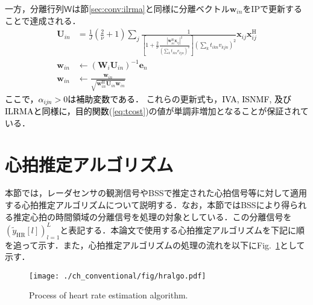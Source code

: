 一方，分離行列$\mathsf{W}$は節\ref{sec:conv:ilrma}と同様に分離ベクトル$\bm{w}_{in}$をIPで更新することで達成される．
\begin{align}
    \bm{U}_{in}&=\frac{1}{J}\left(\frac{2}{\nu}+1\right)\sum_{j}\frac{1}{\left\lbrack1+\frac{2}{\nu}\frac{|\bm{w}_{in}^{\mathrm{H}}\bm{x}_{ij}|^2}{\left(\sum_{k}t_{ikn}v_{kjn}\right)^{2}}\right\rbrack\left(\sum_{k}t_{ikn}v_{kjn}\right)^{2}}\bm{x}_{ij}\bm{x}_{ij}^{\mathrm{H}} \label{eq:tip1} \\
    \bm{w}_{in}&\leftarrow\left(\bm{W}_{i}\bm{U}_{in}\right)^{-1}\bm{e}_{n} \label{eq:tip2} \\
    \bm{w}_{in}&\leftarrow\frac{\bm{w}_{in}}{\sqrt{\bm{w}_{in}^{\mathrm{H}}\bm{U}_{in}\bm{w}_{in}}} \label{eq:tip3}
\end{align}
\textcolor{black}{ここで，$\alpha_{ijn}>0$は補助変数である．}
これらの更新式も，\textcolor{black}{IVA, ISNMF, 及びILRMAと同様に，目的関数}(\ref{eq:tcost})の値が単調非増加となることが保証されている．


\section{心拍推定アルゴリズム}
\label{sec:conv:heartrateestalgo}

本節では，レーダセンサの観測信号やBSSで推定された心拍信号等に対して適用する心拍推定アルゴリズムについて説明する．なお，本節ではBSSにより得られる推定心拍の時間領域の分離信号を処理の対象としている．この分離信号を$( \tilde{y}_\mathrm{HR}[l] )_{l=1}^L$と表記する．本論文で使用する心拍推定アルゴリズムを下記に順を追って示す．また，心拍推定アルゴリズムの処理の流れを以下にFig.~\ref{fig:hralgo}として示す．

\begin{figure}[tb]
\centering
\texttt{[image: ./ch\_conventional/fig/hralgo.pdf]}
\caption{Process of heart rate estimation algorithm.}
\label{fig:hralgo}
\end{figure}

